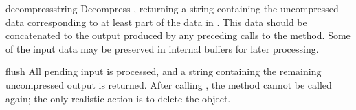 \begin{methoddesc}[Decompress]{decompress}{string}
Decompress , returning a string containing the
uncompressed data corresponding to at least part of the data in
.  This data should be concatenated to the output produced
by any preceding calls to the
 method.  Some of the input data may be preserved
in internal buffers for later processing.
\end{methoddesc}

\begin{methoddesc}[Decompress]{flush}{}
All pending input is processed, and a string containing the remaining
uncompressed output is returned.  After calling , the
 method cannot be called again; the only realistic
action is to delete the object.
\end{methoddesc}

\begin{seealso}
\end{seealso}


